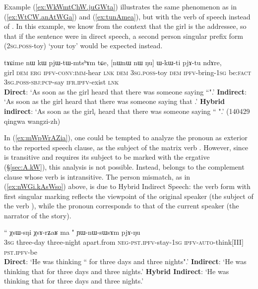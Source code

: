 Example (\ref{ex:WkWmtChW.juGWta}) illustrates the same phenomenon as in (\ref{ex:WtCW.anAtWGa}) and (\ref{ex:tunAmea}), but with the verb of speech  instead of . In this example, we know from the context that the girl is the addressee, so that if the sentence were in direct speech, a second person singular prefix form  (\textsc{2sg}.\textsc{poss}-toy) `your toy' would be expected instead.
 
\begin{exe}
\ex \label{ex:WkWmtChW.juGWta}
\gll  tɤɕime nɯ kɯ pjɯ-tɯ-mtsʰɤm tɕe, [nɯnɯ  nɯ  	 ŋu] ɯ-kɯ-ti pjɤ-tu ndɤre, \\
girl \textsc{dem} \textsc{erg} \textsc{ipfv}-\textsc{conv}:\textsc{imm}-hear \textsc{lnk} \textsc{dem}  \textsc{3sg}.\textsc{poss}-toy  \textsc{dem}  \textsc{ipfv}-bring-\textsc{1sg}  be:\textsc{fact} \textsc{3sg}.\textsc{poss}-\textsc{sbj}:\textsc{pcp}-say \textsc{ifr}.\textsc{ipfv}-exist \textsc{lnk} \\
\glt   \textbf{Direct}: `As soon as the girl heard that there was someone saying ``".'
\glt   \textbf{Indirect}:  `As soon as the girl heard that there was someone saying that .'
\glt   \textbf{Hybrid indirect}: `As soon as the girl$_i$ heard that there was someone saying `` ".' (140429 qingwa wangzi-zh)
\end{exe}


In (\ref{ex:mWpWrAZia}), one could be tempted to analyze the pronoun  as exterior to the reported speech clause, as the subject of the matrix verb . However, since  is transitive and requires its subject to be marked with the ergative (§\ref{sec:A.kW}), this analysis is not possible. Instead,   belongs to the complement clause whose verb  is intransitive. The person mismatch, as in (\ref{ex:nWGi.kAsWso}) above, is due to Hybrid Indirect Speech: the verb form  with first singular marking reflects the viewpoint of the original speaker (the subject of the verb ), while the pronoun  corresponds to that of the current speaker (the narrator of the story). 
  
\begin{exe}
\ex \label{ex:mWpWrAZia}
\gll   `` χsɯ-sŋi χsɤ-rʑaʁ ma " ɲɯ-nɯ-sɯsɤm pjɤ-ŋu \\
 \textsc{3sg} three-day  three-night apart.from \textsc{neg}-\textsc{pst}.\textsc{ipfv}-stay-\textsc{1sg} \textsc{ipfv}-\textsc{auto}-think[III] \textsc{pst}.\textsc{ipfv}-be \\
\glt    \textbf{Direct}: `He was thinking `` for three days and three nights".'
\glt    \textbf{Indirect}: `He was thinking that  for three days and three nights.'
\glt  \textbf{Hybrid Indirect}: `He was thinking that   for three days and three nights.' 
\end{exe}

